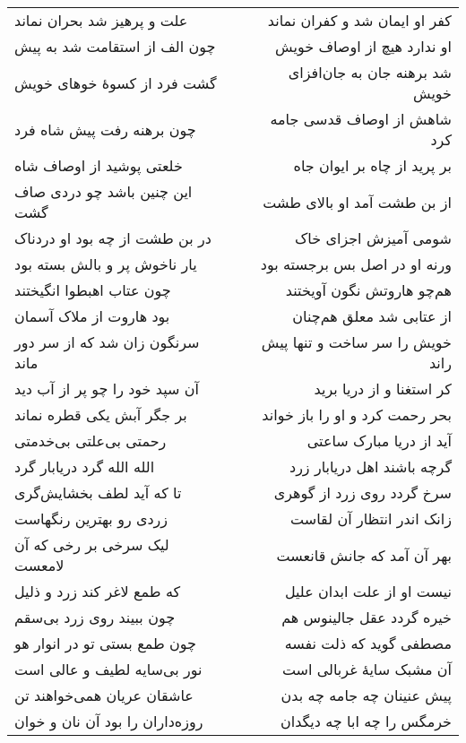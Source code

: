\begin{center}
\begin{longtable}{l p{0.5cm} r}
\\
علت و پرهیز شد بحران نماند
&&
کفر او ایمان شد و کفران نماند
\\
چون الف از استقامت شد به پیش
&&
او ندارد هیچ از اوصاف خویش
\\
گشت فرد از کسوهٔ خوهای خویش
&&
شد برهنه جان به جان‌افزای خویش
\\
چون برهنه رفت پیش شاه فرد
&&
شاهش از اوصاف قدسی جامه کرد
\\
خلعتی پوشید از اوصاف شاه
&&
بر پرید از چاه بر ایوان جاه
\\
این چنین باشد چو دردی صاف گشت
&&
از بن طشت آمد او بالای طشت
\\
در بن طشت از چه بود او دردناک
&&
شومی آمیزش اجزای خاک
\\
یار ناخوش پر و بالش بسته بود
&&
ورنه او در اصل بس برجسته بود
\\
چون عتاب اهبطوا انگیختند
&&
هم‌چو هاروتش نگون آویختند
\\
بود هاروت از ملاک آسمان
&&
از عتابی شد معلق هم‌چنان
\\
سرنگون زان شد که از سر دور ماند
&&
خویش را سر ساخت و تنها پیش راند
\\
آن سپد خود را چو پر از آب دید
&&
کر استغنا و از دریا برید
\\
بر جگر آبش یکی قطره نماند
&&
بحر رحمت کرد و او را باز خواند
\\
رحمتی بی‌علتی بی‌خدمتی
&&
آید از دریا مبارک ساعتی
\\
الله الله گرد دریابار گرد
&&
گرچه باشند اهل دریابار زرد
\\
تا که آید لطف بخشایش‌گری
&&
سرخ گردد روی زرد از گوهری
\\
زردی رو بهترین رنگهاست
&&
زانک اندر انتظار آن لقاست
\\
لیک سرخی بر رخی که آن لامعست
&&
بهر آن آمد که جانش قانعست
\\
که طمع لاغر کند زرد و ذلیل
&&
نیست او از علت ابدان علیل
\\
چون ببیند روی زرد بی‌سقم
&&
خیره گردد عقل جالینوس هم
\\
چون طمع بستی تو در انوار هو
&&
مصطفی گوید که ذلت نفسه
\\
نور بی‌سایه لطیف و عالی است
&&
آن مشبک سایهٔ غربالی است
\\
عاشقان عریان همی‌خواهند تن
&&
پیش عنینان چه جامه چه بدن
\\
روزه‌داران را بود آن نان و خوان
&&
خرمگس را چه ابا چه دیگدان
\\
\end{longtable}
\end{center}
